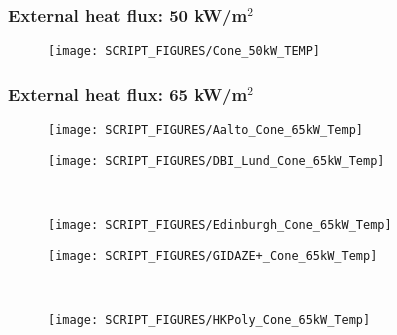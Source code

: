 \subsubsection{External heat flux: 50 kW/m$^2$}
\begin{minipage}{0.5\textwidth}
\begin{figure}[H]
{\texttt{[image: SCRIPT\_FIGURES/Cone\_50kW\_TEMP]}}\\
\end{figure}
\end{minipage}
\subsubsection{External heat flux: 65 kW/m$^2$}
\begin{minipage}{0.5\textwidth}
\begin{figure}[H]
{\texttt{[image: SCRIPT\_FIGURES/Aalto\_Cone\_65kW\_Temp]}}\\
\end{figure}
\end{minipage}
\begin{minipage}{0.35\textwidth}
\begin{figure}[H]
{\texttt{[image: SCRIPT\_FIGURES/DBI\_Lund\_Cone\_65kW\_Temp]}}\\
\end{figure}
\end{minipage}\\
\begin{minipage}{0.5\textwidth}
\begin{figure}[H]
{\texttt{[image: SCRIPT\_FIGURES/Edinburgh\_Cone\_65kW\_Temp]}}\\
\end{figure}
\end{minipage}
\begin{minipage}{0.35\textwidth}
\begin{figure}[H]
{\texttt{[image: SCRIPT\_FIGURES/GIDAZE+\_Cone\_65kW\_Temp]}}\\
\end{figure}
\end{minipage}\\
\begin{minipage}{0.5\textwidth}
\begin{figure}[H]
{\texttt{[image: SCRIPT\_FIGURES/HKPoly\_Cone\_65kW\_Temp]}}\\
\end{figure}
\end{minipage}
